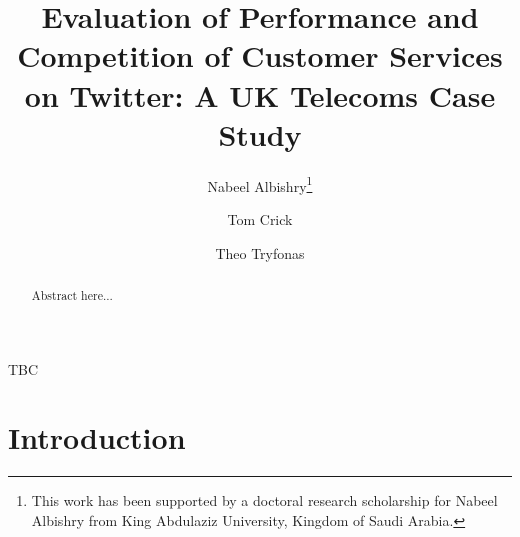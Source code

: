 \documentclass{llncs}
\begin{document}
\title{Evaluation of Performance and Competition of Customer Services on
  Twitter: A UK Telecoms Case Study}

\author{Nabeel Albishry\thanks{This work has been supported by a doctoral research scholarship for
Nabeel Albishry from King Abdulaziz University, Kingdom of Saudi
Arabia.} \and Tom
  Crick \and Theo Tryfonas}



\maketitle

\begin{abstract}
Abstract here...
 \end{abstract}

\begin{keywords}
TBC
\end{keywords}

\section{Introduction}\label{intro}






\end{document}
